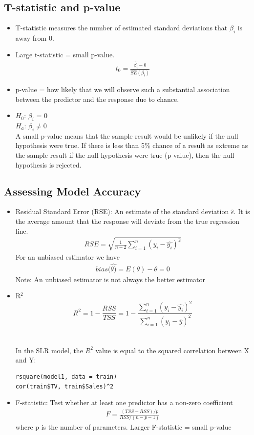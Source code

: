 \documentclass[12pt, oneside]{article}
\begin{document}
\subsection{T-statistic and p-value}
\begin{itemize}
    \item T-statistic measures the number of estimated standard deviations that $\beta_i$ is away from 0.
    \item Large t-statistic = small p-value.
    \begin{align*}
        t_0 =  \frac{\hat{\beta_i} - 0}{\widehat{SE}(\beta_i)}
    \end{align*}
    \item p-value = how likely that we will observe such a substantial association between the predictor and the response due to chance. 
    \item $H_0$: $\beta_i$ = 0 \\
    $H_a$: $\beta_i \neq 0$\\
    A small p-value means that the sample result would be unlikely if the null hypothesis were true. If there is less than 5\% chance of a result as extreme as the sample result if the null hypothesis were true (p-value), then the null hypothesis is rejected.
\end{itemize}

\subsection{Assessing Model Accuracy}
\begin{itemize}
   \item Residual Standard Error (RSE): An estimate of the standard deviation $\hat{\epsilon}$. It is the average amount that the response will deviate from the true regression line. 
   \begin{align*}
       RSE = \sqrt{\frac{1}{n-2}\sum^n_{i=1}(y_i-\widehat{y_i})^2}
   \end{align*}
   For an unbiased estimator we have 
   \begin{align*}
       bias(\hat{\theta)} =E(\theta) - \theta = 0 
   \end{align*}
   Note: An unbiased estimator is not always the better estimator
   \item R$^2$
   $$R^2 = 1- \frac{RSS}{TSS} = 1 - \frac{\sum^n_{i=1}(y_i-\widehat{y_i})^2}{\sum^n_{i=1}(y_i-\overline{y})^2}$$ \\ \\
   In the SLR model, the $R^2$ value is equal to the squared correlation between X and Y:
   \begin{lstlisting}
rsquare(model1, data = train)
cor(train$TV, train$Sales)^2
   \end{lstlisting}
  
   \item F-statistic: Test whether at least one predictor has a non-zero coefficient
   \begin{align*}
       F = \frac{(TSS-RSS)/p}{RSS/(n - p - 1)}
   \end{align*}
   where p is the number of parameters. Larger F-statistic = small p-value
   
\end{itemize}
\end{document}
